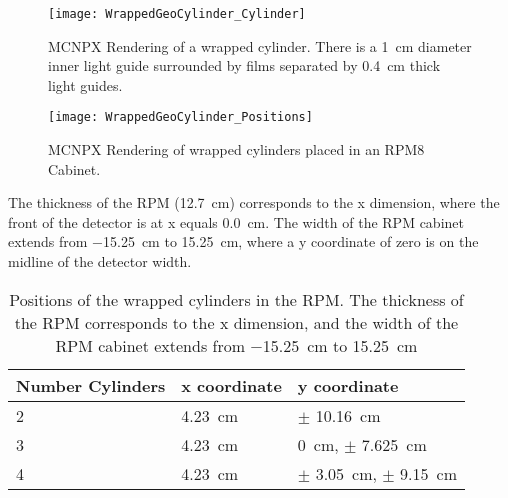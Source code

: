 \begin{figure}
  \centering
  \texttt{[image: WrappedGeoCylinder\_Cylinder]}
  \caption[Rendering of Wrapped Cylinder Geometry]{MCNPX Rendering of a wrapped cylinder.  There is a \SI{1}{\cm} diameter inner light guide surrounded by films separated by \SI{0.4}{\cm} thick light guides.}
  \label{fig:WrappedCylinderGeo}
\end{figure}
\begin{figure}
  \centering
  \texttt{[image: WrappedGeoCylinder\_Positions]}
  \caption[Positions of Wrapped Cylinders in RPM Cabinet]{MCNPX Rendering of wrapped cylinders placed in an RPM8 Cabinet.}
  \label{fig:WrappedCylinderPos}
\end{figure}
The thickness of the RPM (\SI{12.7}{\cm}) corresponds to the x dimension, where the front of the detector is at x equals \SI{0.0}{\cm}.
The width of the RPM cabinet extends from \SI{-15.25}{\cm} to \SI{15.25}{\cm}, where a y coordinate of zero is on the midline of the detector width.
\begin{table}
  \caption[Wrapped Cylinder Positions]{Positions of the wrapped cylinders in the RPM. The thickness of the RPM corresponds to the x dimension, and the width of the RPM cabinet extends from \SI{-15.25}{\cm} to \SI{15.25}{\cm}}
  \label{tab:WrappedCylinderPositions}
  \begin{tabular}{m{2cm} | m{3cm} m{4cm} }
    \toprule
    Number Cylinders & x coordinate & y coordinate \\
    \midrule
    2 & \SI{4.23}{\cm} & $\pm$ \SI{10.16}{\cm} \\
    3 & \SI{4.23}{\cm} & \SI{0}{\cm}, $\pm$ \SI{7.625}{\cm} \\
    4 & \SI{4.23}{\cm} & $\pm$ \SI{3.05}{\cm}, $\pm$ \SI{9.15}{\cm} \\
    \bottomrule
  \end{tabular}
\end{table}
